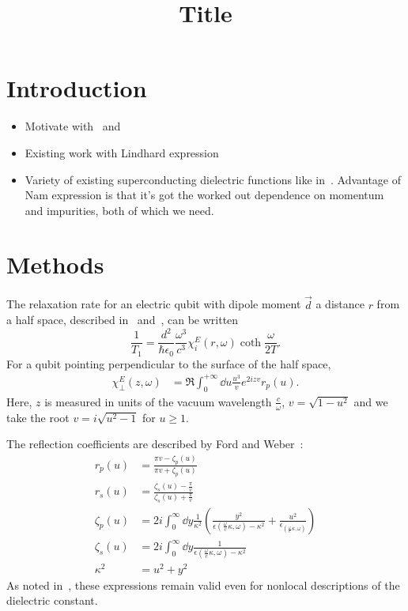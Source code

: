 \documentclass{article}
\title{Title}
\begin{document}
\maketitle

\section{Introduction \label{sec:intro}}
\begin{itemize}
	\item Motivate with~\cite{Tenberg2019} and~\cite{Kolkowitz2015}
	\item Existing work with Lindhard expression~\cite{QubitRelax}
	\item Variety of existing superconducting dielectric functions like in~\cite{AGD, llv9, Zimmermann1991, Mattis, Tinkham}.
	Advantage of Nam expression\cite{Nam1967} is that it's got the worked out dependence on momentum and impurities, both of which we need.
\end{itemize}
\section{Methods \label{sec:methods}}



	The relaxation rate for an electric qubit with dipole moment $\vec{d}$ a distance $r$ from a half space, described in~\cite{Henkel1999} and~\cite{QubitRelax}, can be written
	\begin{equation}
		\frac{1}{T_1} = \frac{d^2}{\hbar \epsilon_0} \frac{\omega^3}{c^3} \chi_{i}^{E}(r, \omega) \coth\frac{\omega}{2 T}.
	\end{equation}
	For a qubit pointing perpendicular to the surface of the half space,
	\begin{align}
		\chi_\perp^E(z, \omega) &= \Re \int_0^{+\infty} \dd{u} \frac{u^3}{v} e^{2 i z v} r_p(u). \label{eq:chi}
	\end{align}
	Here, $z$ is measured in units of the vacuum wavelength $\frac{c}{\omega}$, $v = \sqrt{1 - u^2}$ and we take the root $v = i \sqrt{u^2 - 1}$ for $u \geq 1$.

	The reflection coefficients are described by Ford and Weber~\cite{Ford1984}:
	\begin{align}
		r_p(u) &= \frac{\pi v - \zeta_p(u)}{\pi v + \zeta_p(u)} \\
		r_s(u) &= \frac{\zeta_s(u) - \frac{\pi}{v}}{\zeta_s(u) + \frac{\pi}{v}} \\
		\zeta_p(u) &= 2i \int_0^\infty \dd{y} \frac{1}{\kappa^2} \left( \frac{y^2}{\epsilon(\frac{\omega}{c}\kappa, \omega) - \kappa^2} + \frac{u^2}{\epsilon_(\frac{\omega}{c}\kappa, \omega)} \right) \label{eq:zp} \\
		\zeta_s(u) &= 2i \int_0^\infty \dd{y} \frac{1}{\epsilon(\frac{\omega}{c}\kappa, \omega) - \kappa^2} \label{eq:zs} \\
		\kappa^2 &= u^2 + y^2
	\end{align}
	As noted in~\cite{QubitRelax}, these expressions remain valid even for nonlocal descriptions of the dielectric constant.
\end{document}
